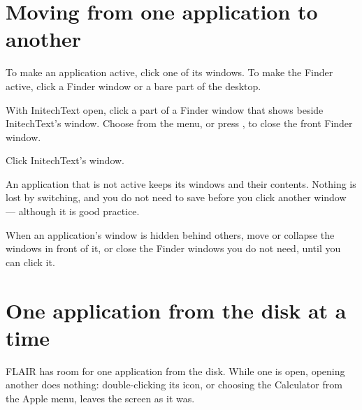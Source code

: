 \section{Moving from one application to another}
To make an application active, click one of its windows.  To make the
Finder active, click a Finder window or a bare part of the desktop.

\begin{TaskSteps}
\Step With InitechText open, click a part of a Finder window that shows
beside InitechText's window.
\Step Choose  from the  menu, or press
, to close the front Finder window.
\end{TaskSteps}


\begin{TaskSteps}[resume]
\Step Click InitechText's window.
\end{TaskSteps}

An application that is not active keeps its windows and their contents.
Nothing is lost by switching, and you do not need to save before you click
another window --- although it is good practice.

When an application's window is hidden behind others, move or collapse the
windows in front of it, or close the Finder windows you do not need, until
you can click it.

\section{One application from the disk at a time}
FLAIR has room for one application from the disk.  While one is open,
opening another does nothing: double-clicking its icon, or choosing the
Calculator from the Apple menu, leaves the screen as it was.


